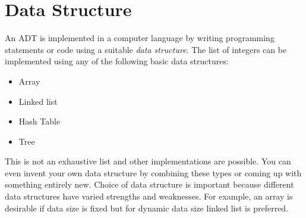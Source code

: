 \documentclass[12pt,a4paper]{article}
\begin{document}
\section{Data Structure}
An ADT is implemented in a computer language by writing programming statements or code using a suitable \textit{data structure}. The list of integers can be implemented using any of the following basic data structures:
\begin{itemize}
\item Array
\item Linked list
\item Hash Table
\item Tree
\end{itemize}
This is not an exhaustive list and other implementations are possible. You can even invent your own data structure by combining these types or coming up with something entirely new. Choice of data structure is important because different data structures have varied strengths and weaknesses. For example, an array is desirable if data size is fixed but for dynamic data size linked list is preferred.
%
\end{document}
